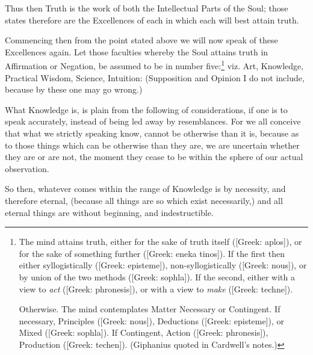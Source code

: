 Thus then Truth is the work of both the Intellectual Parts of the Soul; those
states therefore are the Excellences of each in which each will best attain
truth.


Commencing then from the point stated above we will now speak of these
Excellences again. Let those faculties whereby the Soul attains truth in
Affirmation or Negation, be assumed to be in number five:\footnote{The mind attains truth, either for the sake of truth itself ([Greek: aplos]),
or for the sake of something further ([Greek: eneka tinos]). If the first then
either syllogistically ([Greek: episteme]), non-syllogistically ([Greek:
nous]), or by union of the two methods ([Greek: sophla]). If the second, either
with a view to \emph{act} ([Greek: phronesis]), or with a view to \emph{make}
([Greek: techne]).

Otherwise. The mind contemplates Matter Necessary or Contingent. If
necessary, Principles ([Greek: nous]), Deductions ([Greek: episteme]), or Mixed
([Greek: sophla]). If Contingent, Action ([Greek: phronesis]), Production
([Greek: techen]). (Giphanius quoted in Cardwell’s notes.)}
viz. Art, Knowledge, Practical Wisdom, Science, Intuition: (Supposition
and Opinion I do not include, because by these one may go wrong.)

What Knowledge is, is plain from the following of considerations, if one is to
speak accurately, instead of being led away by resemblances. For we all
conceive that what we strictly speaking know, cannot be otherwise than it is,
because as to those things which can be otherwise than they are, we are
uncertain whether they are or are not, the moment they cease to be within the
sphere of our actual observation.

So then, whatever comes within the range of Knowledge is by necessity, and
therefore eternal, (because all things are so which exist necessarily,) and all
eternal things are without beginning, and indestructible.

